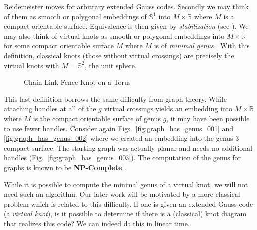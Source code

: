        Reidemeister moves for arbitrary extended Gauss codes. Secondly we may
        think of them as smooth or polygonal embeddings of $\mathbb{S}^{1}$ into
        $M\times\mathbb{R}$ where $M$ is a compact orientable surface.
        Equivalence is then given by \textit{stabilization}
        (see \cite{CarterKamadaSaitoVirtualKnotCobordisms}). We may also think
        of virtual knots as smooth or polygonal embeddings into
        $M\times\mathbb{R}$ for some compact orientable surface $M$ where $M$
        is of \textit{minimal genus} \cite{KuperbergVirtualLink}.
        With this definition, classical knots (those without virtual crossings)
        are precisely the virtual knots with $M=\mathbb{S}^{2}$,
        the unit sphere.
        \begin{figure}
            \centering
            \caption{Chain Link Fence Knot on a Torus}
            \label{fig:chain_link_fence_knot_on_torus}
        \end{figure}
        \par\hfill\par
        This last definition borrows the same difficulty from graph theory.
        While attaching handles at all of the $g$ virtual crossings yields an
        embedding into $M\times\mathbb{R}$ where $M$ is the compact orientable
        surface of genus $g$, it may have been possible to use fewer handles.
        Consider again Figs.~\ref{fig:graph_has_genus_001} and
        \ref{fig:graph_has_genus_002} where we created an embedding into the
        genus 3 compact surface. The starting graph was actually planar and
        needs no additional handles (Fig.~\ref{fig:graph_has_genus_003}).
        The computation of the genus for graphs is known to be
        \textbf{NP-Complete} \cite{GareyJohnsonGraphCrossingNumberNPComplete}.
        \par\hfill\par
        While it is possible to compute the minimal genus of a virtual knot,
        we will not need such an algorithm. Our later work will be motivated
        by a more classical problem which is related to this difficulty.
        If one is given an extended Gauss code (a \textit{virtual knot}),
        is it possible to determine if there is a (classical) knot diagram
        that realizes this code? We can indeed do this in linear time.
        \par\hfill\par
